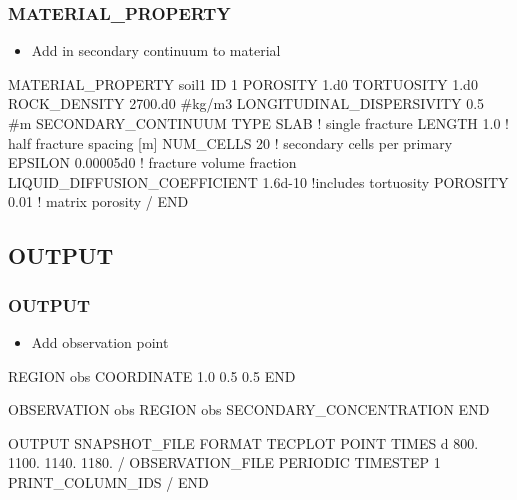 \documentclass{beamer}
\newcommand\bluecomment[1]{{{\color{blue} #1}}}
\newcommand\magentacomment[1]{{{\color{magenta} #1}}}
\begin{document}
\begin{frame}[fragile]\frametitle{MATERIAL\_PROPERTY}

\begin{itemize}
\item Add in secondary continuum to material
\end{itemize}

	
\begin{semiverbatim}
MATERIAL_PROPERTY soil1
ID 1
POROSITY \magentacomment{1.d0}
TORTUOSITY 1.d0
ROCK_DENSITY 2700.d0 #kg/m3
LONGITUDINAL_DISPERSIVITY 0.5 #m
\magentacomment{SECONDARY_CONTINUUM
  TYPE SLAB               \bluecomment{! single fracture}
  LENGTH 1.0              \bluecomment{! half fracture spacing [m]}
  NUM_CELLS 20            \bluecomment{! secondary cells per primary}
  EPSILON 0.00005d0       \bluecomment{! fracture volume fraction}
  LIQUID_DIFFUSION_COEFFICIENT 1.6d-10\bluecomment{!includes tortuosity}
  POROSITY 0.01           \bluecomment{! matrix porosity}
/ }
END
\end{semiverbatim}
	

\end{frame}

\subsection{OUTPUT}

\begin{frame}[fragile]\frametitle{OUTPUT}
	
	\begin{itemize}
		\item Add observation point
		
	\end{itemize}
	
	\begin{semiverbatim}\small
	\magentacomment{REGION obs
	  COORDINATE 1.0 0.5 0.5
	END}
	
	\magentacomment{OBSERVATION obs
	  REGION obs
	  SECONDARY_CONCENTRATION
	END}
		
	OUTPUT
	  SNAPSHOT_FILE
	    FORMAT TECPLOT POINT
	    TIMES d 800. 1100. 1140. 1180. 
	  /	
	  \magentacomment{OBSERVATION_FILE
	    PERIODIC TIMESTEP 1
	    PRINT_COLUMN_IDS
	  /}
	END
		
	\end{semiverbatim}
	
\end{frame}
\end{document}

